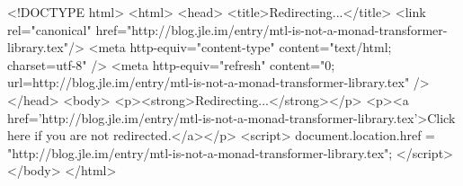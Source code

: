 <!DOCTYPE html>
<html>
<head>
<title>Redirecting...</title>
<link rel="canonical" href="http://blog.jle.im/entry/mtl-is-not-a-monad-transformer-library.tex"/>
<meta http-equiv="content-type" content="text/html; charset=utf-8" />
<meta http-equiv="refresh" content="0; url=http://blog.jle.im/entry/mtl-is-not-a-monad-transformer-library.tex" />
</head>
<body>
  <p><strong>Redirecting...</strong></p>
  <p><a href='http://blog.jle.im/entry/mtl-is-not-a-monad-transformer-library.tex'>Click here if you are not redirected.</a></p>
  <script>
    document.location.href = "http://blog.jle.im/entry/mtl-is-not-a-monad-transformer-library.tex";
  </script>
</body>
</html>
